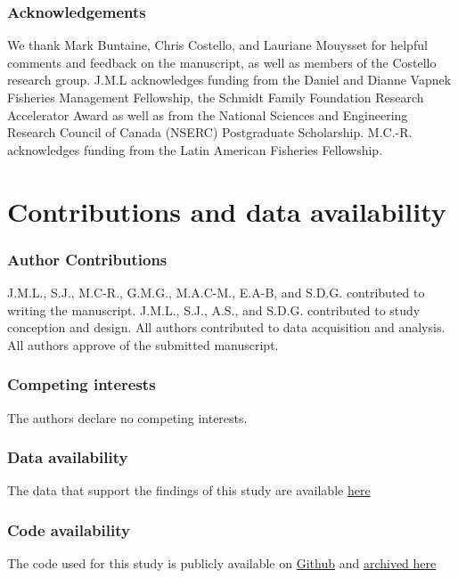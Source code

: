 \subsubsection*{Acknowledgements}
We thank Mark Buntaine, Chris Costello, and Lauriane Mouysset for helpful comments and feedback on the manuscript, as well as members of the Costello research group. J.M.L acknowledges funding from the Daniel and Dianne Vapnek Fisheries Management Fellowship, the Schmidt Family Foundation Research Accelerator Award as well as from the National Sciences and Engineering Research Council of Canada (NSERC) Postgraduate Scholarship. M.C.-R. acknowledges funding from the Latin American Fisheries Fellowship. 

\section{Contributions and data availability}

\subsubsection*{Author Contributions}
J.M.L., S.J., M.C-R., G.M.G., M.A.C-M., E.A-B, and S.D.G. contributed to writing the manuscript. J.M.L., S.J., A.S., and S.D.G. contributed to study conception and design. All authors contributed to data acquisition and analysis. All authors approve of the submitted manuscript.

\subsubsection*{Competing interests}
The authors declare no competing interests.







\subsubsection*{Data availability}
The data that support the findings of this study are available  \href{https://doi.org/10.17605/OSF.IO/6Y8CQ}{here}

\subsubsection*{Code availability}
The code used for this study is publicly available on \href{https://github.com/julawson/conservation_farming_totoaba}{Github} and \href{https://doi.org/10.17605/OSF.IO/6Y8CQ}{archived here}

